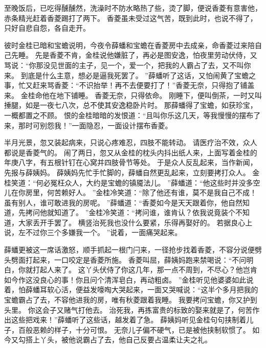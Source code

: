 至晚饭后，已吃得醺醺然，洗澡时不防水略热了些，烫了脚，便说香菱有意害他，赤条精光赶着香菱踢打了两下。
香菱虽未受过这气苦，既到此时，也说不得了，只好自悲自怨，各自走开。
\par
彼时金桂已暗和宝蟾说明，今夜令薛蟠和宝蟾在香菱房中去成亲，命香菱过来陪自己先睡。
先是香菱不肯，金桂说他嫌脏了，再必是图安逸，怕夜里劳动伏侍，又骂说：“你那没见世面的主子，见一个，爱一个，把我的人霸占了去，又不叫你来。
到底是什么主意，想必是逼我死罢了。
”薛蟠听了这话，又怕闹黄了宝蟾之事，忙又赶来骂香菱：“不识抬举！再不去便要打了！”香菱无奈，只得抱了铺盖来。
金桂命他在地下铺睡。
香菱无奈，只得依命。
刚睡下，便叫倒茶，一时又叫捶腿，如是一夜七八次，总不使其安逸稳卧片时。
那薛蟠得了宝蟾，如获珍宝，一概都置之不顾。
恨的金桂暗暗的发恨道：“且叫你乐这几天，等我慢慢的摆布了来，那时可别怨我！”一面隐忍，一面设计摆布香菱。
\par
半月光景，忽又装起病来，只说心疼难忍，四肢不能转动。
请医疗治不效，众人都说是香菱气的。
闹了两日，忽又从金桂的枕头内抖出纸人来，上面写着金桂的年庚八字，有五根针钉在心窝并四肢骨节等处。
于是众人反乱起来，当作新闻，先报与薛姨妈。
薛姨妈先忙手忙脚的，薛蟠自然更乱起来，立刻要拷打众人。
金桂笑道：“何必冤枉众人，大约是宝蟾的镇魇法儿。
”薛蟠道：“他这些时并没多空儿在你房里，何苦赖好人。
”金桂冷笑道：“除了他还有谁，莫不是我自己不成！虽有别人，谁可敢进我的房呢。
”薛蟠道：“香菱如今是天天跟着你，他自然知道，先拷问他就知道了。
”金桂冷笑道：“拷问谁，谁肯认？依我说竟装个不知道，大家丢开手罢了。
横竖治死我也没什么要紧，乐得再娶好的。
若据良心上说，左不过你三个多嫌我一个。
”说着，一面痛哭起来。
\par
薛蟠更被这一席话激怒，顺手抓起一根门闩来，一径抢步找着香菱，不容分说便劈头劈面打起来，一口咬定是香菱所施。
香菱叫屈，薛姨妈跑来禁喝说：“不问明白，你就打起人来了。
这丫头伏侍了你这几年，那一点不周到，不尽心？他岂肯如今作这没良心的事！你且问个清浑皂白，再动粗卤。
”金桂听见他婆婆如此说着，怕薛蟠耳软心活，便益发嚎啕大哭起来，一面又哭喊说：“这半个多月把我的宝蟾霸占了去，不容他进我的房，唯有秋菱跟着我睡。
我要拷问宝蟾，你又护到头里。
你这会子又赌气打他去。
治死我，再拣富贵的标致的娶来就是了，何苦作出这些把戏来！”薛蟠听了这些话，越发着了急。
薛姨妈听见金桂句句挟制着儿子，百般恶赖的样子，十分可恨。
无奈儿子偏不硬气，已是被他挟制软惯了。
如今又勾搭上丫头，被他说霸占了去，他自己反要占温柔让夫之礼。
